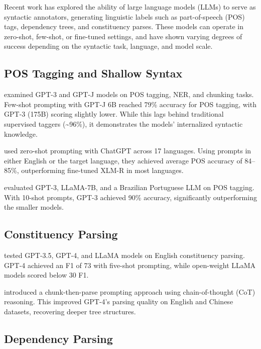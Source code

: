 Recent work has explored the ability of large language models (LLMs) to serve as syntactic annotators, generating linguistic labels such as part-of-speech (POS) tags, dependency trees, and constituency parses. These models can operate in zero-shot, few-shot, or fine-tuned settings, and have shown varying degrees of success depending on the syntactic task, language, and model scale.

\subsection{POS Tagging and Shallow Syntax}

\citet{blevins2023llmpos} examined GPT-3 and GPT-J models on POS tagging, NER, and chunking tasks. Few-shot prompting with GPT-J 6B reached 79\% accuracy for POS tagging, with GPT-3 (175B) scoring slightly lower. While this lags behind traditional supervised taggers (\textasciitilde96\%), it demonstrates the models' internalized syntactic knowledge.

\citet{lai2023chatgptpos} used zero-shot prompting with ChatGPT across 17 languages. Using prompts in either English or the target language, they achieved average POS accuracy of 84--85\%, outperforming fine-tuned XLM-R in most languages.

\citet{machado2024portpos} evaluated GPT-3, LLaMA-7B, and a Brazilian Portuguese LLM on POS tagging. With 10-shot prompts, GPT-3 achieved 90\% accuracy, significantly outperforming the smaller models.

\subsection{Constituency Parsing}

\citet{bai2023llmconst} tested GPT-3.5, GPT-4, and LLaMA models on English constituency parsing. GPT-4 achieved an F1 of 73 with five-shot prompting, while open-weight LLaMA models scored below 30 F1.

\citet{tian2024chunkprompt} introduced a chunk-then-parse prompting approach using chain-of-thought (CoT) reasoning. This improved GPT-4's parsing quality on English and Chinese datasets, recovering deeper tree structures.

\subsection{Dependency Parsing}

